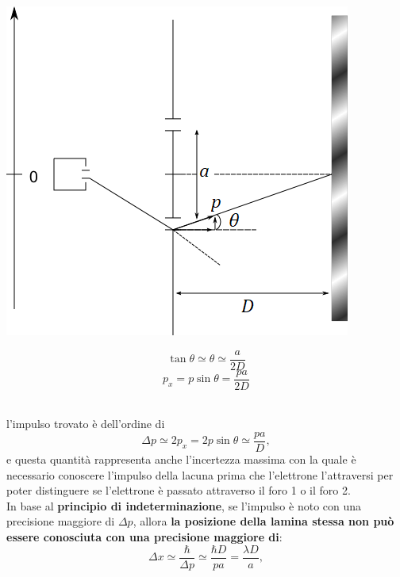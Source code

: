 \begin{minipage}{.5\textwidth}
\includegraphics[width=.8\textwidth]{immagini/cap_2/fig_2_6.png}	
\end{minipage}
\hspace{.5cm}
\begin{minipage}{.4\textwidth}
\begin{equation} \tan \theta \simeq \theta \simeq \frac{a}{2D}
\end{equation}
\begin{equation} p_x = p \sin \theta = \frac{pa}{2D}
\end{equation}
\end{minipage}\\
\vspace{.5cm}
l'impulso trovato è dell'ordine di
\begin{equation}
\Delta p \simeq 2p_x = 2p \sin \theta \simeq \frac{pa}{D},
\end{equation}
e questa quantità rappresenta anche l'incertezza massima con la quale è necessario conoscere l'impulso della lacuna prima che l'elettrone l'attraversi per poter distinguere se l'elettrone è passato attraverso il foro 1 o il foro 2.\\
In base al \textbf{principio di indeterminazione}, se l'impulso è noto con una precisione maggiore di $\Delta  p$, allora \textbf{la posizione della lamina stessa non può essere conosciuta con una precisione maggiore di}:
\begin{equation}
\Delta x \simeq \frac{\hbar}{\Delta p} \simeq \frac{\hbar D}{pa}= \frac{\lambda D}{a},
\end{equation}
